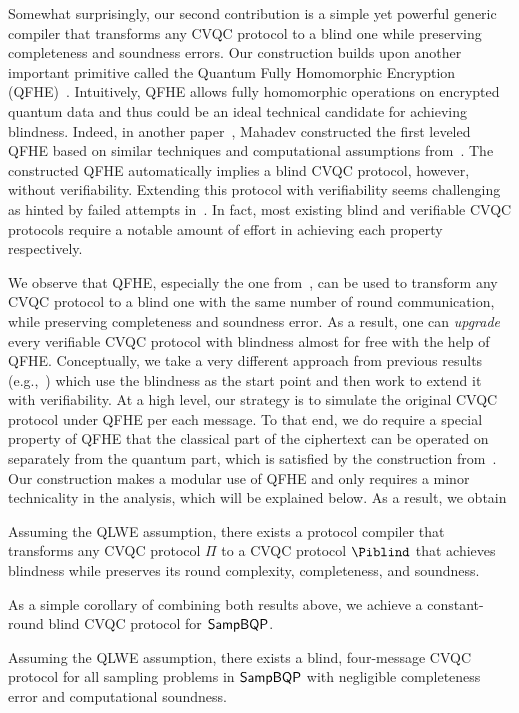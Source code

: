 Somewhat surprisingly, our second contribution is a simple yet powerful generic compiler that transforms any CVQC protocol to a blind one while preserving completeness and soundness errors.
Our construction builds upon another important primitive called the Quantum Fully Homomorphic Encryption (QFHE)~\cite{BJ15, DSS16, LC18, NS18, OTF18, mahadev_qfhe}.
Intuitively, QFHE allows fully homomorphic operations on encrypted quantum data and thus could be an ideal technical candidate for achieving blindness.
Indeed, in another paper~\cite{mahadev_qfhe}, Mahadev constructed the first leveled QFHE based on similar techniques and computational assumptions from~\cite{FOCS:Mahadev18a}.
The constructed QFHE automatically implies a blind CVQC protocol, however, without verifiability.
Extending this protocol with verifiability seems challenging as hinted by failed attempts in~\cite{mahadev_2018}.
In fact, most existing blind and verifiable CVQC protocols require a notable amount of effort in achieving each property respectively.

We observe that QFHE, especially the one from~\cite{mahadev_qfhe}, can be used to transform any CVQC protocol to a blind one with the same number of round communication, while preserving completeness and soundness error.
As a result, one can \emph{upgrade} every verifiable CVQC protocol with blindness almost for free with the help of QFHE.
Conceptually, we take a very different approach from previous results (e.g.,~\cite{FK17}) which use the blindness as the start point and then work to extend it with verifiability.
At a high level, our strategy is to simulate the original CVQC protocol under QFHE per each message.
To that end, we do require a special property of QFHE that the classical part of the ciphertext can be operated on separately from the quantum part, which is satisfied by the construction from~\cite{mahadev_qfhe}.
Our construction makes a modular use of QFHE and only requires a minor technicality in the analysis, which will be explained below. As a result, we obtain
\begin{theorem}[informal]
Assuming the QLWE assumption, there exists a protocol compiler that transforms any CVQC protocol $\Pi$ to a CVQC protocol $\Piblind$ that achieves blindness while preserves its round complexity, completeness, and soundness.
\end{theorem}




As a simple corollary of combining both results above, we achieve a constant-round blind CVQC protocol for $\operatorname{\mathsf{SampBQP}}$. %
\begin{theorem}[informal]
        Assuming the QLWE assumption, there exists a blind, four-message CVQC protocol for all sampling problems in $\operatorname{\mathsf{SampBQP}}$ with negligible completeness error and computational soundness.
\end{theorem}

